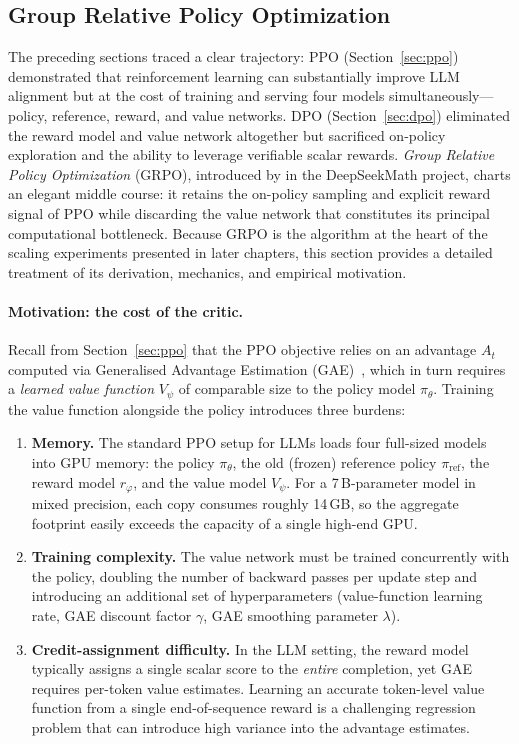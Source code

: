 \subsection{Group Relative Policy Optimization}
\label{sec:grpo}

The preceding sections traced a clear trajectory: PPO
(Section~\ref{sec:ppo}) demonstrated that reinforcement learning can
substantially improve LLM alignment but at the cost of training and serving
four models simultaneously---policy, reference, reward, and value networks.
DPO (Section~\ref{sec:dpo}) eliminated the reward model and value network
altogether but sacrificed on-policy exploration and the ability to leverage
verifiable scalar rewards.  \emph{Group Relative Policy Optimization}
(GRPO), introduced by \cite{shao2024deepseekmath} in the DeepSeekMath
project, charts an elegant middle course: it retains the on-policy sampling
and explicit reward signal of PPO while discarding the value network that
constitutes its principal computational bottleneck.  Because GRPO is the
algorithm at the heart of the scaling experiments presented in later
chapters, this section provides a detailed treatment of its derivation,
mechanics, and empirical motivation.

\paragraph{Motivation: the cost of the critic.}
Recall from Section~\ref{sec:ppo} that the PPO objective relies on an
advantage $A_t$ computed via Generalised Advantage Estimation
(GAE)~\cite{schulman2017ppo}, which in turn requires a \emph{learned value
function} $V_\psi$ of comparable size to the policy model $\pi_\theta$.
Training the value function alongside the policy introduces three
burdens:
\begin{enumerate}[leftmargin=1.8em,itemsep=2pt]
\item \textbf{Memory.}  The standard PPO setup for LLMs loads four
      full-sized models into GPU memory: the policy $\pi_\theta$, the old
      (frozen) reference policy $\pi_{\text{ref}}$, the reward model
      $r_\varphi$, and the value model $V_\psi$.  For a 7\,B-parameter
      model in mixed precision, each copy consumes roughly 14\,GB, so the
      aggregate footprint easily exceeds the capacity of a single
      high-end GPU.
\item \textbf{Training complexity.}  The value network must be trained
      concurrently with the policy, doubling the number of backward passes
      per update step and introducing an additional set of hyperparameters
      (value-function learning rate, GAE discount factor $\gamma$, GAE
      smoothing parameter $\lambda$).
\item \textbf{Credit-assignment difficulty.}  In the LLM setting, the
      reward model typically assigns a single scalar score to the
      \emph{entire} completion, yet GAE requires per-token value
      estimates.  Learning an accurate token-level value function from a
      single end-of-sequence reward is a challenging regression problem
      that can introduce high variance into the advantage estimates.
\end{enumerate}

